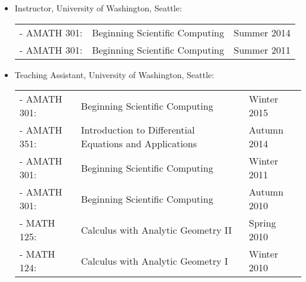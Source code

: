 \documentclass{article}
\begin{document}
\begin{itemize}
  \item Instructor, University of Washington, Seattle:

    \begin{tabular}{ p{2.25cm} p{10.5cm} p{2.25cm} }
      - AMATH 301: & Beginning Scientific Computing      & Summer 2014 \\
      - AMATH 301: & Beginning Scientific Computing      & Summer 2011 \\
    \end{tabular}

  \item Teaching Assistant, University of Washington, Seattle:

    \begin{tabular}{ p{2.25cm} p{10.5cm} p{2.25cm} }
      - AMATH 301: & Beginning Scientific Computing      & Winter 2015 \\
      - AMATH 351: & Introduction to Differential Equations and Applications
                   & Autumn 2014 \\
      - AMATH 301: & Beginning Scientific Computing      & Winter 2011 \\
      - AMATH 301: & Beginning Scientific Computing      & Autumn 2010 \\
      - MATH 125:  & Calculus with Analytic Geometry II  & Spring 2010 \\
      - MATH 124:  & Calculus with Analytic Geometry I   & Winter 2010 \\
    \end{tabular}

\end{itemize}



\pagebreak










\end{document}
